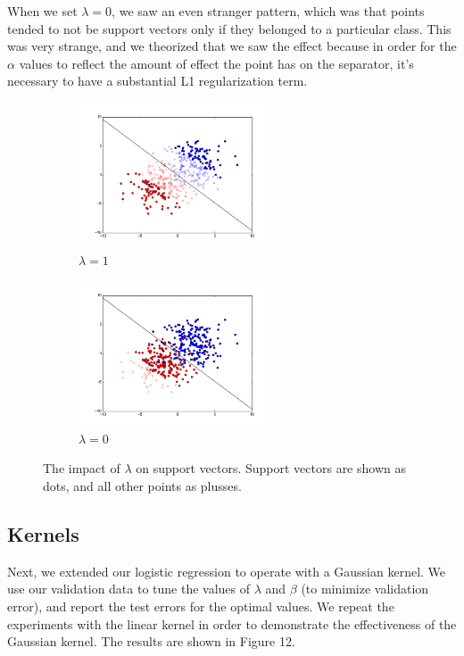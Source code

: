 \documentclass{sigchi}
\begin{document}
When we set $\lambda = 0$, we saw an even stranger pattern, which was that points tended to not be support vectors only if they belonged to a particular class. This was very strange, and we theorized that we saw the effect because in order for the $\alpha$ values to reflect the amount of effect the point has on the separator, it's necessary to have a substantial L1 regularization term.

\begin{figure}
\centering

\begin{subfigure}[b]{2.25in}
	\includegraphics[width = 2.25in]{plots/stdev2_test_plot_lambda_sup_vectors.png}
	\caption{$\lambda = 1$}
\end{subfigure}

\begin{subfigure}[b]{2.25in}
	\includegraphics[width = 2.25in]{plots/stdev2_test_plot_lambda_0_supvec.png}
	\caption{$\lambda = 0$}
\end{subfigure}
\caption{The impact of $\lambda$ on support vectors. Support vectors are shown as dots, and all other points as plusses.}
\end{figure}

\subsection{Kernels}

Next, we extended our logistic regression to operate with a Gaussian kernel. We use our validation data to tune the values of $\lambda$ and $\beta$ (to minimize validation error), and report the test errors for the optimal values. We repeat the experiments with the linear kernel in order to demonstrate the effectiveness of the Gaussian kernel. The results are shown in Figure 12.
\end{document}
